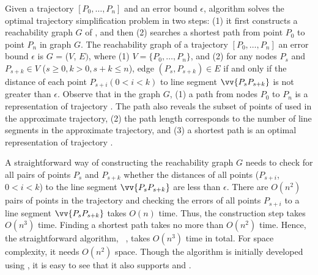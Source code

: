 
Given a trajectory ${[P_0, \ldots, P_n]}$ and an error bound $\epsilon$, algorithm \opt \cite{Imai:Optimal} solves the optimal trajectory simplification problem  in two steps: (1) it first constructs a reachability graph $G$ of , and then (2) searches a shortest path from point $P_0$ to point $P_{n}$ in graph $G$.
%
The reachability graph of a trajectory ${[P_0, \ldots, P_n]}$ \wrt an error bound $\epsilon$ is $G$ = ($V$, $E)$, where (1) $V = \{P_0, \ldots, P_n\}$, and (2) for any nodes $P_s$ and $P_{s+k} \in V$ ($s\ge 0, k>0, s+k\le n$), edge $(P_s, P_{s+k}) \in E$ if and only if the distance of each point $P_{s+i} (0<i<k)$ to line segment $\vv{P_sP_{s+k}}$ is not greater than $\epsilon$.
%
Observe that in the graph $G$, (1) a path from nodes $P_0$ to $P_{n}$ is a representation of trajectory . The path also reveals the subset of points of  used in the approximate trajectory, (2) the path length corresponds to the number of line segments in the approximate trajectory, and
(3) a shortest path is an optimal representation of trajectory .

A straightforward way of constructing the reachability graph $G$ needs to check for all pairs of points $P_s$ and $P_{s+k}$ whether the distances of all points ($P_{s+i}$, $0<i<k$) to the line segment $\vv{P_sP_{s+k}}$ are less than $\epsilon$.
There are $O(n^2)$ pairs of points in the trajectory and checking the errors of all points $P_{s+i}$ to a line segment $\vv{P_sP_{s+k}}$ takes $O(n)$ time.
Thus, the construction step takes $O(n^3)$ time.
Finding a shortest path takes no more than $O(n^2)$ time. Hence, the straightforward algorithm, \ie~\opt, takes $O(n^3)$ time in total.
For space complexity, it needs $O(n^2)$ space.
%
Though the algorithm is initially developed using \ped, it is easy to see that it also supports \sed and \dad.


